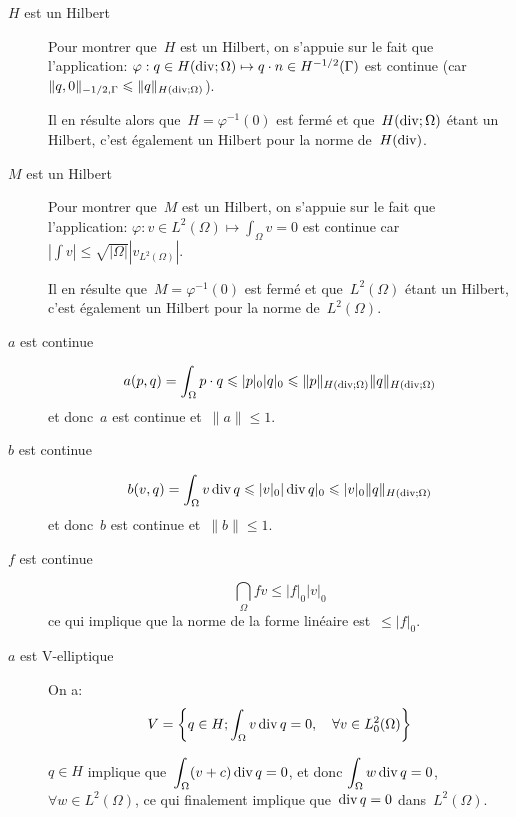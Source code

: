 \begin{description}
\item[$H$ est un Hilbert]
Pour montrer que~$H$ est un Hilbert, on s'appuie sur le fait que l'application:
$\varphi: q\in H(\operatorname{div};\Omega)\mapsto q\cdot n\in H^{-1/2}(\Gamma)$ est continue
(car~$\|q,0\|_{-1/2,\Gamma}\leqslant \|q\|_{H(\operatorname{div};\Omega)}$).

Il en résulte alors que~$H=\varphi^{-1}(0)$ est fermé et que~$H(\operatorname{div};\Omega)$ étant un
Hilbert, c'est également un Hilbert pour la norme de~$H(\operatorname{div})$.

\medskip
\item[$M$ est un Hilbert]
Pour montrer que~$M$ est un Hilbert, on s'appuie sur le fait que l'application:
$\varphi: v\in L^2(\Omega)\mapsto \int_\Omega v=0$ est continue
car~$|\int v| \le \sqrt{|\Omega|} |v_{L^2(\Omega)}|$.

Il en résulte que~$M=\varphi^{-1}(0)$ est fermé et que~$L^2(\Omega)$ étant un
Hilbert, c'est également un Hilbert pour la norme de~$L^2(\Omega)$.

\medskip
\item[$a$ est continue]
\begin{equation}a(p,q)=\displaystyle\int_\Omega p\cdot q\leqslant |p|_0 |q|_0 \leqslant \|p\|_{H(\operatorname{div};\Omega)} \|q\|_{H(\operatorname{div};\Omega)}\end{equation}
et donc~$a$ est continue et~$\|a\|\le 1$.

\medskip
\item[$b$ est continue]
\begin{equation}b(v,q)=\displaystyle\int_\Omega v \operatorname{div} q \leqslant |v|_0 |\operatorname{div} q|_0 \leqslant |v|_0 \|q\|_{H(\operatorname{div};\Omega)}\end{equation}
et donc~$b$ est continue et~$\|b\|\le 1$.

\medskip
\item[$f$ est continue]
\begin{equation}\dint_\Omega fv\le |f|_0 |v|_0\end{equation} ce qui implique que la norme de la forme linéaire
est~$\le |f|_0$.

\medskip
\item[$a$ est V-elliptique]
On a:
\begin{equation}V=\left\{ q\in H; \displaystyle\int_\Omega v \operatorname{div} q =0,\quad \forall v\in L^2_0(\Omega)\right\}\end{equation}

$q\in H$ implique que~$\displaystyle\int_\Omega (v+c)\operatorname{div} q =0$, et donc
$\displaystyle\int_\Omega w \operatorname{div} q=0$, $\forall w\in L^2(\Omega)$, ce qui finalement
implique que~$\operatorname{div} q=0$ dans~$L^2(\Omega)$.


\end{description}

